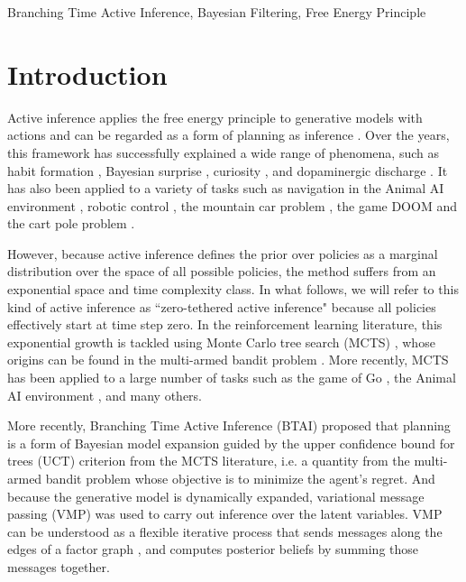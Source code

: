 \documentclass[twoside,11pt]{article}
\begin{document}
\begin{keywords}
Branching Time Active Inference, Bayesian Filtering, Free Energy Principle
\end{keywords}

\section{Introduction}

Active inference applies the free energy principle to generative models with actions \citep{FRISTON2016862,AI_TUTO,AI_VMP} and can be regarded as a form of planning as inference \citep{PAI}. Over the years, this framework has successfully explained a wide range of phenomena, such as habit formation \citep{FRISTON2016862}, Bayesian surprise \citep{bayes_surprise}, curiosity \citep{curiosity}, and dopaminergic discharge \citep{dopamine}. It has also been applied to a variety of tasks such as navigation in the Animal AI environment \citep{DeepAIwithMCMC}, robotic control \citep{pezzato2020active,sancaktar2020endtoend}, the mountain car problem \citep{catal2020learning}, the  game DOOM \citep{CULLEN2018809} and the cart pole problem \citep{cart_pole}.

However, because active inference defines the prior over policies as a marginal distribution over the space of all possible policies, the method suffers from an exponential space and time complexity class. In what follows, we will refer to this kind of active inference as ``zero-tethered active inference" because all policies effectively start at time step zero. In the reinforcement learning literature, this exponential growth is tackled using Monte Carlo tree search (MCTS) \citep{6145622}, whose origins can be found in the multi-armed bandit problem \citep{Auer2002}. More recently, MCTS has been applied to a large number of tasks such as the game of Go \citep{Go}, the Animal AI environment \citep{DeepAIwithMCMC}, and many others.

More recently, Branching Time Active Inference (BTAI) \citep{AITS_THEORY,AITS_PRACTICE} proposed that planning is a form of Bayesian model expansion guided by the upper confidence bound for trees (UCT) criterion from the MCTS literature, i.e. a quantity from the multi-armed bandit problem whose objective is to minimize the agent's regret. And because the generative model is dynamically expanded, variational message passing (VMP) \citep{VMP_TUTO} was used to carry out inference over the latent variables. VMP can be understood as a flexible iterative process that sends messages along the edges of a factor graph \citep{FFG_TUTO}, and computes posterior beliefs by summing those messages together.
\end{document}
